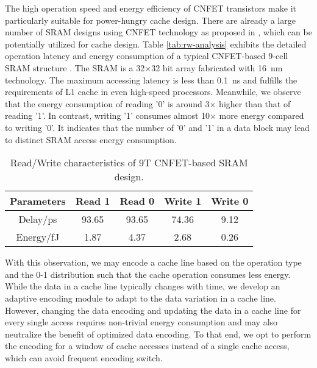 The high operation speed and energy efficiency of CNFET transistors 
make it particularly suitable for power-hungry cache design. 
There are already a large number of SRAM designs using CNFET technology as
proposed in \cite{zhang2012sram, kim2008low, sun2014novel, 
maruthamuthu2013ultra, zhang2011low, sun2017high, sun2018metallic}, which 
can be potentially utilized for cache design. Table \ref{tab:rw-analysis} exhibits 
the detailed operation latency and energy consumption of a typical 
CNFET-based 9-cell SRAM structure \cite{sun2017high,sun2018metallic}. 
The SRAM is a 32$\times$32 bit array fabricated with \SI{16}{nm} technology.
The maximum accessing latency is less than \SI{0.1}{ns} and fulfills the requirements of 
L1 cache in even high-speed processors. Meanwhile, we observe that 
the energy consumption of reading '0' is around 3$\times$ higher 
than that of reading '1'. In contrast, writing '1' consumes almost 10$\times$ 
more energy compared to writing '0'. It indicates that the number of '0' 
and '1' in a data block may lead to distinct SRAM access energy consumption. 

\begin{table}
    \centering
    \label{tab:rw-analysis}
	\caption{Read/Write characteristics of 9T CNFET-based SRAM design\cite{sun2017high}.}
  \label{tab:characteristic-SRAM}
  \begin{tabular}{ccccc}
    \toprule
      Parameters & Read 1 
      & Read 0 
      & Write 1 
      & Write 0 \\
    \midrule
	Delay/ps & 93.65 & 93.65 & 74.36 & 9.12 \\
	Energy/fJ & 1.87 & 4.37 & 2.68  & 0.26 \\
  \bottomrule
\end{tabular}
\vspace{-1em}
\end{table}

With this observation, we may encode a cache line based on the operation type 
and the 0-1 distribution such that the cache operation consumes less energy. 
While the data in a cache line typically changes with time, we develop an adaptive 
encoding module to adapt to the data variation in a cache line. However, changing the 
data encoding and updating the data in a cache line for every single access 
requires non-trivial energy consumption and may also neutralize the benefit of optimized 
data encoding. To that end, we opt to perform the encoding for a window of cache accesses 
instead of a single cache access, which can avoid frequent encoding switch.

